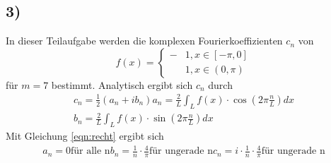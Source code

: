 \subsection*{3)}
In dieser Teilaufgabe werden die komplexen Fourierkoeffizienten $c_n$ von 
\begin{equation}
    f(x) = \begin{cases}
        -&1, x \in \left[ - \pi, 0\right] \\
         &1, x \in \left(0 , \pi\right)
    \end{cases}
    \label{eqn:recht}
\end{equation}
für $ m = 7 $ bestimmt. 
Analytisch ergibt sich $c_n$ durch 
\begin{align}
    c_n = \frac{1}{2} \left( a_n + i b_n \right)
    a_n = \frac{2}{L} \int_L f(x) \cdot \cos(  2\pi \frac{n}{L}) dx \\
    b_n = \frac{2}{L} \int_L f(x) \cdot \sin(  2\pi \frac{n}{L}) dx
\end{align}
Mit Gleichung \eqref{eqn:recht} ergibt sich 
\begin{align}
    a_n = 0 \text{für alle n}
    b_n = \frac{1}{n} \cdot \frac{4}{\pi} \text{für ungerade n}
    c_n = i \cdot \frac{1}{n} \cdot \frac{4}{\pi} \text{für ungerade n}
\end{align}
